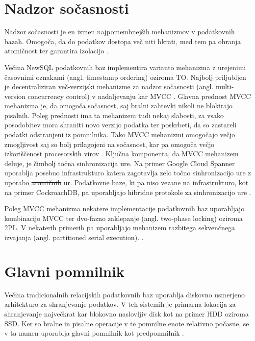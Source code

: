 \documentclass[a4paper, 12pt]{book}
\providecommand{\DIFaddtex}[1]{{\protect\color{blue}\uwave{#1}}} %
\providecommand{\DIFdeltex}[1]{{\protect\color{red}\sout{#1}}}                      %
\providecommand{\DIFaddbegin}{} %
\providecommand{\DIFaddend}{} %
\providecommand{\DIFdelbegin}{} %
\providecommand{\DIFdelend}{} %
\providecommand{\DIFadd}[1]{\texorpdfstring{\DIFaddtex{#1}}{#1}} %
\providecommand{\DIFdel}[1]{\texorpdfstring{\DIFdeltex{#1}}{}} %
\newcommand{\DIFscaledelfig}{0.5}
\newlength{\DIFdelgraphicswidth} %
\newlength{\DIFdelgraphicsheight} %
\newcommand{\DIFaddincludegraphics}[2][]{{\color{blue}\fbox{\DIFOincludegraphics[#1]{#2}}}} %
\newcommand{\DIFdelincludegraphics}[2][]{%
\sbox{\DIFdelgraphicsbox}{\DIFOincludegraphics[#1]{#2}}%
\settoboxwidth{\DIFdelgraphicswidth}{\DIFdelgraphicsbox} %
\settoboxtotalheight{\DIFdelgraphicsheight}{\DIFdelgraphicsbox} %
\scalebox{\DIFscaledelfig}{%
\parbox[b]{\DIFdelgraphicswidth}{\usebox{\DIFdelgraphicsbox}\\[-\baselineskip] \rule{\DIFdelgraphicswidth}{0em}}\llap{\resizebox{\DIFdelgraphicswidth}{\DIFdelgraphicsheight}{%
\setlength{\unitlength}{\DIFdelgraphicswidth}%
\begin{picture}(1,1)%
\thicklines\linethickness{2pt} %
{\color[rgb]{1,0,0}\put(0,0){\framebox(1,1){}}}%
{\color[rgb]{1,0,0}\put(0,0){\line( 1,1){1}}}%
{\color[rgb]{1,0,0}\put(0,1){\line(1,-1){1}}}%
\end{picture}%
}\hspace*{3pt}}} %
} %
\DeclareRobustCommand{\DIFaddbegin}{\DIFOaddbegin \let\includegraphics\DIFaddincludegraphics} %
\DeclareRobustCommand{\DIFaddend}{\DIFOaddend \let\includegraphics\DIFOincludegraphics} %
\DeclareRobustCommand{\DIFdelbegin}{\DIFOdelbegin \let\includegraphics\DIFdelincludegraphics} %
\DeclareRobustCommand{\DIFdelend}{\DIFOaddend \let\includegraphics\DIFOincludegraphics} %
\begin{document}
\section{Nadzor sočasnosti}
Nadzor sočasnosti je en izmen najpomembnejših mehanizmov v podatkovnih bazah. Omogoča, da do podatkov dostopa več niti hkrati, med tem pa ohranja atomičnost ter garantira izolacijo \cite{Pavlo2016Sep}.

Večina NewSQL podatkovnih baz implementira varianto mehanizma z urejenimi časovnimi oznakami (angl. timestamp ordering) oziroma TO. Najbolj priljubljen je decentraliziran več-verzijski mehanizme za nadzor so\-čas\-no\-sti (angl. multi-version concurrency control) v nadaljevanju kar MVCC \cite{Pavlo2016Sep}.
Glavna prednost MVCC mehanizma je, da omogoča sočasnost, saj bralni zahtevki nikoli ne blokirajo pisalnih. Poleg prednosti ima ta mehanizem tudi nekaj slabosti, za vsako posodobitev mora shraniti novo verzijo podatka ter poskrbeti, da so zastareli podatki odstranjeni iz pomnilnika. Tako MVCC mehanizmi omogočajo večjo zmogljivost saj so bolj prilagojeni na sočasnost, kar pa omogoča večjo izkoriščenost procesorskih virov \cite{MainMemoryDatabaseSystems}. Ključna komponenta, da MVCC mehanizem deluje, je čimbolj točna sinhronizacija ure. Na primer Google Cloud Spanner uporablja posebno infrastrukturo katera zagotavlja zelo točno sinhronizacijo ure z uporabo \DIFdelbegin \DIFdel{atomičnih }\DIFdelend \DIFaddbegin \DIFadd{atomskih }\DIFaddend ur. Podatkovne baze, ki pa niso vezane na infrastrukturo, kot na primer CockroachDB, pa uporabljajo hibridne protokole za sinhronizacijo ure \cite{Pavlo2016Sep}.

Poleg MVCC mehanizma nekatere implementacije podatkovnih baz uporabljajo kombinacijo MVCC ter dvo-fazno zaklepanje (angl. two-phase locking) oziroma 2PL. V nekaterih primerih pa uporabljajo mehanizem razbitega sekvenčnega izvajanja (angl. partitioned serial
execution). \cite{Pavlo2016Sep, MainMemoryDatabaseSystems}.

\section{Glavni pomnilnik}

Večina tradicionalnih relacijskih podatkovnih baz uporablja diskovno usmerjeno arhitekturo za shranjevanje podatkov. V teh sistemih je primarna lokacija za shranjevanje največkrat kar blokovno naslovljiv disk kot na primer HDD oziroma SSD. Ker so bralne in pisalne operacije v te pomnilne enote relativno počasne, se v ta namen uporablja glavni pomnilnik kot predpomnilnik \cite{Pavlo2016Sep}.
\end{document}
